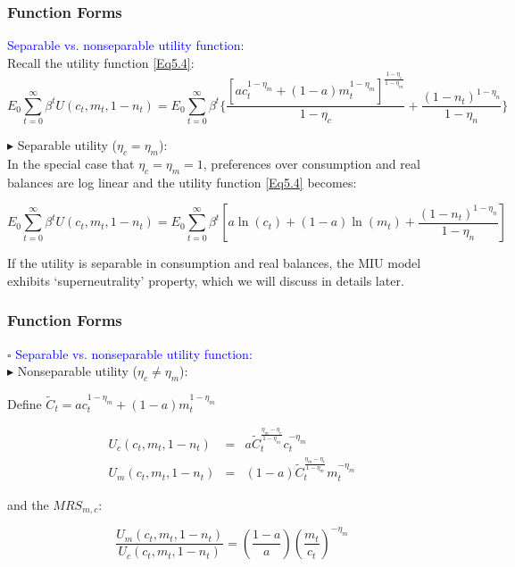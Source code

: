 \documentclass[handout]{beamer}
\begin{document}
\begin{frame}
\frametitle{Function Forms}\vskip 0.1in

\textcolor{blue}{Separable vs. nonseparable utility function:}\\

Recall the utility function \eqref{Eq5.4}: {\scriptsize{
\begin{equation}\nonumber %
E_{0}\sum_{t=0}^{\infty} \beta^{t} U(c_{t},m_{t},1-n_{t}) =
E_{0}\sum_{t=0}^{\infty} \beta^{t}
\bigl\{\frac{[ac_{t}^{1-\eta_{m}}+
(1-a)m_{t}^{1-\eta_{m}}]^{\frac{1-\eta_{c}}{1-\eta_{m}}}}{1-\eta_{c}}
+ \frac{(1-n_{t})^{1-\eta_{n}}}{1-\eta_{n}} \bigr\}
\end{equation}
}}

$\blacktriangleright$ Separable utility ($\eta_{c}=\eta_{m}$):\\
In the special case that $\eta_{c}=\eta_{m}=1$, preferences over
consumption and real balances are log linear and the utility
function \eqref{Eq5.4} becomes:

{\tiny{
\begin{equation}\label{Eq5.20}
E_{0}\sum_{t=0}^{\infty} \beta^{t} U(c_{t},m_{t},1-n_{t}) =
E_{0}\sum_{t=0}^{\infty} \beta^{t} [a \ln(c_{t})+ (1-a) \ln(m_{t})  +
\frac{(1-n_{t})^{1-\eta_{n}}}{1-\eta_{n}} ]
\end{equation}}}

If the utility is separable in consumption and real balances, the
MIU model exhibits `superneutrality' property, which we will
discuss in details later.
\end{frame}





\begin{frame}
\frametitle{Function Forms}\vskip 0.1in

$\square$ \textcolor{blue}{Separable vs. nonseparable utility function:}\\

$\blacktriangleright$ Nonseparable utility ($\eta_{c}\neq
\eta_{m}$):\\\vskip 0.1in

Define $\tilde{C}_{t}=ac_{t}^{1-\eta_{m}}+ (1-a)m_{t}^{1-\eta_{m}}$

\begin{eqnarray}
U_{c}(c_{t},m_{t},1-n_{t}) &=& a
\tilde{C}_{t}^{\frac{\eta_{m}-\eta_{c}}{1-\eta_{m}}}
c_{t}^{-\eta_{m}} \label{Eq5.21}\\
U_{m}(c_{t},m_{t},1-n_{t}) &=&
(1-a)\tilde{C}_{t}^{\frac{\eta_{m}-\eta_{c}}{1-\eta_{m}}}
m_{t}^{-\eta_{m}} \label{Eq5.22}
\end{eqnarray}

and the $MRS_{m,c}$:

\begin{equation}\label{Eq5.23}
\frac{U_{m}(c_{t},m_{t},1-n_{t})}{U_{c}(c_{t},m_{t},1-n_{t})} =
(\frac{1-a}{a}) (\frac{m_{t}}{c_{t}})^{-\eta_{m}}
\end{equation}


\end{frame}
\end{document}
